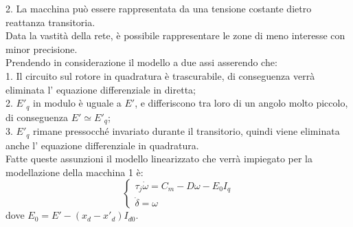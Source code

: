 \documentclass[Lau,noexaminfo]{sapthesis}
\begin{document}
	2. La macchina può essere rappresentata da una tensione costante dietro reattanza transitoria.\\
	Data la vastità della rete,  è possibile rappresentare le zone di meno interesse con minor precisione.\\
	Prendendo in considerazione il modello a due assi asserendo che:\\
	1. Il circuito sul rotore in quadratura è trascurabile, di conseguenza verrà eliminata l' equazione differenziale in diretta;\\
	2. $E'_q$ in modulo è uguale a $E'$, e differiscono tra loro di un angolo molto piccolo, di conseguenza $E'\simeq E'_q$;\\
	3. $E'_q$ rimane pressocché invariato durante il transitorio, quindi viene eliminata anche l' equazione differenziale in quadratura.\\
	Fatte queste assunzioni il modello linearizzato che verrà impiegato per la modellazione della macchina 1 è:\\
	\[
	\begin{cases}
	\tau_j\dot{\omega}=C_m-D\omega-E_0I_q\\
	\dot{\delta}=\omega
	\end{cases}
	\]
	dove $E_0=E'-(x_d-x'_d)I_{d0}$.
\end{document}
